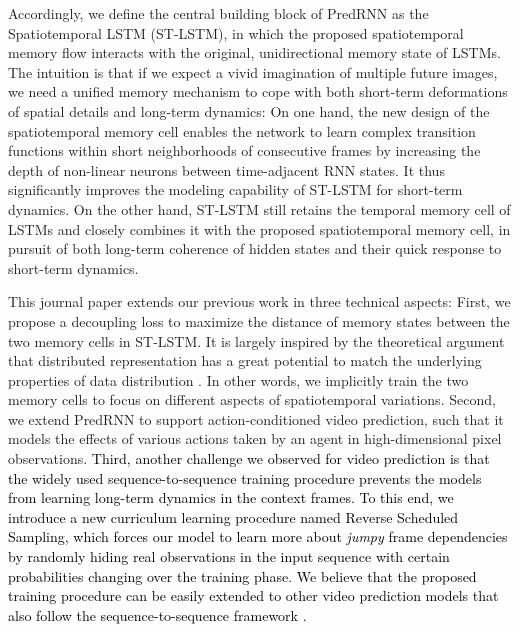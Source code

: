 \documentclass[10pt,journal,compsoc]{IEEEtran}
\newcommand{\revise}[1]{{\textcolor{black}{#1}}}
\begin{document}
Accordingly, we define the central building block of PredRNN as the Spatiotemporal LSTM (ST-LSTM), in which the proposed spatiotemporal memory flow interacts with the original, unidirectional memory state of LSTMs. 
The intuition is that if we expect a vivid imagination of multiple future images, we need a unified memory mechanism to cope with both short-term deformations of spatial details and long-term dynamics: On one hand, the new design of the spatiotemporal memory cell enables the network to learn complex transition functions within short neighborhoods of consecutive frames by increasing the depth of non-linear neurons between time-adjacent RNN states. It thus significantly improves the modeling capability of ST-LSTM for short-term dynamics. 
On the other hand, ST-LSTM still retains the temporal memory cell of LSTMs and closely combines it with the proposed spatiotemporal memory cell, in pursuit of both long-term coherence of hidden states and their quick response to short-term dynamics.



This journal paper extends our previous work \cite{wang2017predrnn} in three technical aspects:
First, we propose a decoupling loss to maximize the distance of memory states between the two memory cells in ST-LSTM. It is largely inspired by the theoretical argument that distributed representation has a great potential to match the underlying properties of data distribution \cite{pascanu2013number}. In other words, we implicitly train the two memory cells to focus on different aspects of spatiotemporal variations.
Second, we extend PredRNN to support action-conditioned video prediction, such that it models the effects of various actions taken by an agent in high-dimensional pixel observations.
\revise{
Third, another challenge we observed for video prediction is that the widely used sequence-to-sequence training procedure \cite{Sutskever2011Generating} prevents the models from learning long-term dynamics in the context frames.
To this end, we introduce a new curriculum learning procedure named Reverse Scheduled Sampling, which forces our model to learn more about \textit{jumpy} frame dependencies by randomly hiding real observations in the input sequence with certain probabilities changing over the training phase. 
We believe that the proposed training procedure can be easily extended to other video prediction models that also follow the sequence-to-sequence framework \cite{Sutskever2011Generating}.
}
\end{document}
